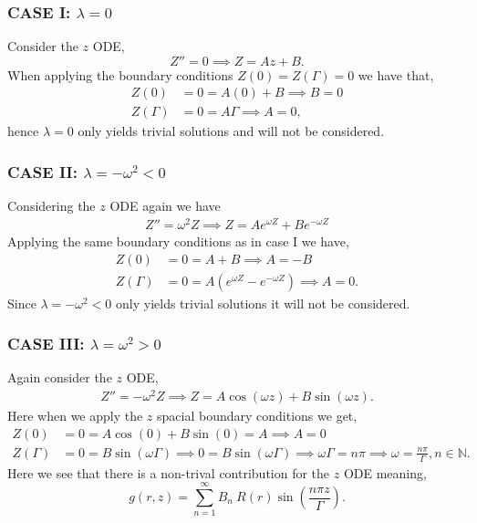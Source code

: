 \documentclass[11pt,letterpaper]{article}
\newcommand{\fpar}[1]{\left({#1}\right)} %
\newcommand{\N}{\mathbb N} %
\begin{document}
\subsubsection*{CASE I: $\lambda = 0$}
Consider the $z$ ODE,
\begin{equation*}
    Z'' = 0 \implies Z = Az +B.
\end{equation*}
When applying the boundary conditions $Z(0)=Z(\Gamma) = 0 $ we have that, 
\begin{align*}
    Z(0) &= 0 = A(0) +B \implies B = 0\\    
    Z(\Gamma) &= 0 = A\Gamma \implies A = 0,
\end{align*}
hence $\lambda = 0$ only yields trivial solutions and will not be considered.

\subsubsection*{CASE II: $\lambda = -\omega^2<0$}
Considering the $z$ ODE again we have
\begin{align*}
    Z'' = \omega^2Z \implies Z = Ae^{\omega Z}+Be^{-\omega Z}
\end{align*}
Applying the same boundary conditions as in case I we have,
\begin{align*}
    Z(0) &= 0 = A+B \implies A=-B\\
    Z(\Gamma) &= 0 = A\fpar{e^{\omega Z}-e^{-\omega Z}} \implies A = 0.
\end{align*}
Since $\lambda = -\omega^2<0$ only yields trivial solutions it will not be considered. 

\subsubsection*{CASE III: $\lambda = \omega^2>0$}
Again consider the $z$ ODE, 
\begin{align*}
    Z''=-\omega^2Z \implies Z = A\cos\fpar{\omega z } + B\sin\fpar{\omega z }.
\end{align*}
Here when we apply the $z$ spacial boundary conditions we get,
\begin{align*}
    Z(0) &= 0 =  A\cos\fpar{0} + B\sin\fpar{0} = A \implies A = 0\\
    Z(\Gamma) &= 0 = B\sin\fpar{\omega \Gamma } \implies 0 = B\sin\fpar{\omega \Gamma } \implies \omega\Gamma = n\pi \implies \omega = \frac{n\pi}{\Gamma}, n\in\N.
\end{align*}
Here we see that there is a non-trival contribution for the $z$ ODE meaning,
\begin{equation}
    g(r,z) =\sum^\infty_{n=1} B_n\ R(r)\sin\fpar{\frac{n\pi z}{\Gamma}}.
\end{equation}
\end{document}
